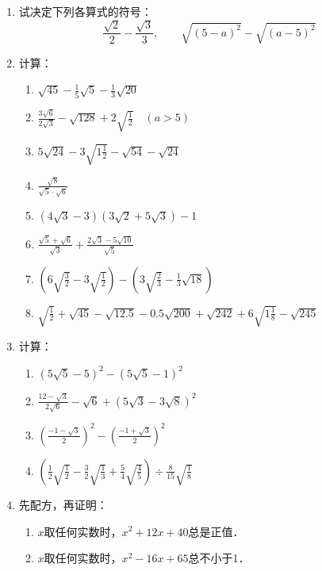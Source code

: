 \begin{enumerate}
\item 试决定下列各算式的符号：
\[\frac{\sqrt{2}}{2}-\frac{\sqrt{3}}{3},\qquad \sqrt{(5-a)^2}-\sqrt{(a-5)^2} \]

\item 计算：
\begin{enumerate}
    \item $\sqrt{45}-\frac{1}{5}\sqrt{5}-\frac{1}{3}\sqrt{20}$
    \item $\frac{3\sqrt{6}}{2\sqrt{3}}-\sqrt{128}+2\sqrt{\frac{1}{2}}\quad (a>5)$
    \item $5\sqrt{24}-3\sqrt{1\frac{1}{2}}-\sqrt{54}-\sqrt{24}$
    \item $\frac{\sqrt{8}}{\sqrt{5}\cdot \sqrt{6}}$
    \item $\left(4\sqrt{3}-3\right)\left(3\sqrt{2}+5\sqrt{3}\right)-1$
    \item $\frac{\sqrt{5}+\sqrt{6}}{\sqrt{3}}+\frac{2\sqrt{3}-5\sqrt{10}}{\sqrt{5}}$
    \item $\left(6\sqrt{\frac{3}{2}}-3\sqrt{\frac{1}{2}}\right)-\left(3\sqrt{\frac{2}{3}}-\frac{1}{3}\sqrt{18}\right)$
    \item $\sqrt{\frac{1}{2}}+\sqrt{45}-\sqrt{12.5}-0.5\sqrt{200}+\sqrt{242}+6\sqrt{1\frac{1}{8}}-\sqrt{245}$
\end{enumerate}

\item 计算：
\begin{enumerate}
    \item $\left(5\sqrt{5}-5\right)^2-\left(5\sqrt{5}-1\right)^2$
    \item $\frac{12-\sqrt{3}}{2\sqrt{6}}-\sqrt{6}+\left(5\sqrt{3}-3\sqrt{8}\right)^2$
    \item $\left(\frac{-1-\sqrt{3}}{2}\right)^2-\left(\frac{-1+\sqrt{3}}{2}\right)^2$
    \item $\left(\frac{1}{2}\sqrt{\frac{1}{2}}-\frac{3}{2}\sqrt{\frac{1}{3}}+\frac{5}{4}\sqrt{\frac{4}{5}}\right)\div \frac{8}{15}\sqrt{\frac{1}{8}}$

\end{enumerate}

\item 先配方，再证明：
\begin{enumerate}
    \item $x$取任何实数时，$x^2+12x+40$总是正值．
    \item $x$取任何实数时，$x^2-16x+65$总不小于1．
\end{enumerate}


\end{enumerate}
